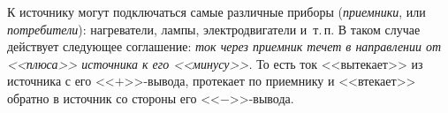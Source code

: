\documentclass[main.tex]{subfiles}
\begin{document}







К источнику могут подключаться самые различные приборы (\emph{приемники}, или \emph{потребители}): нагреватели, лампы, электродвигатели и~т.\,п. В таком случае действует следующее соглашение: \emph{ток через приемник течет в направлении от <<плюса>> источника к его <<минусу>>.} То есть ток <<вытекает>> из источника с его <<$+$>>-вывода, протекает по приемнику и <<втекает>> обратно в источник со стороны его <<$-$>>-вывода.









 
\end{document}
